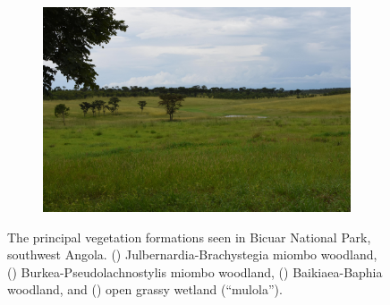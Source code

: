 \begin{refsection}
\begin{figure}
\begin{subfigure}{0.45\linewidth}
		\caption{}
		\label{intro:baikiaea}
	\end{subfigure}
	\hfill
	\begin{subfigure}{0.45\linewidth}
		\includegraphics[width=\linewidth]{img/bicuar_photos/mulola_crop}
		\caption{}
		\label{intro:mulola}
	\end{subfigure}
	\caption[Bicuar National Park vegetation type photographs]{The principal vegetation formations seen in Bicuar National Park, southwest Angola. () Julbernardia-Brachystegia miombo woodland, () Burkea-Pseudolachnostylis miombo woodland, () Baikiaea-Baphia woodland, and () open grassy wetland (``mulola'').}
	\label{intro:bicuar_photos}
\end{figure}


\end{refsection}
